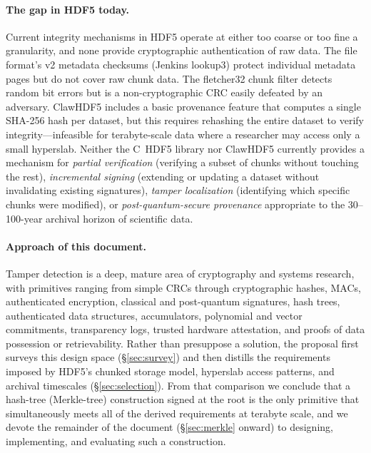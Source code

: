 \documentclass[11pt]{article}
\begin{document}
\paragraph{The gap in HDF5 today.}
Current integrity mechanisms in HDF5 operate at either too coarse or too fine
a granularity, and none provide cryptographic authentication of raw data. The
file format's v2 metadata checksums (Jenkins lookup3) protect individual
metadata pages but do not cover raw chunk data. The fletcher32 chunk filter
detects random bit errors but is a non-cryptographic CRC easily defeated by
an adversary. ClawHDF5 includes a basic provenance feature that computes a
single SHA-256 hash per dataset, but this requires rehashing the entire
dataset to verify integrity---infeasible for terabyte-scale data where a
researcher may access only a small hyperslab. Neither the C~HDF5 library nor
ClawHDF5 currently provides a mechanism for \emph{partial verification}
(verifying a subset of chunks without touching the rest), \emph{incremental
signing} (extending or updating a dataset without invalidating existing
signatures), \emph{tamper localization} (identifying which specific chunks
were modified), or \emph{post-quantum-secure provenance} appropriate to the
30--100-year archival horizon of scientific data.

\paragraph{Approach of this document.}

Tamper detection is a deep, mature area of cryptography and systems research,
with primitives ranging from simple CRCs through cryptographic hashes, MACs,
authenticated encryption, classical and post-quantum signatures, hash trees,
authenticated data structures, accumulators, polynomial and vector
commitments, transparency logs, trusted hardware attestation, and proofs of
data possession or retrievability. Rather than presuppose a solution, the
proposal first surveys this design space (\S\ref{sec:survey}) and then
distills the requirements imposed by HDF5's chunked storage model, hyperslab
access patterns, and archival timescales (\S\ref{sec:selection}). From that
comparison we conclude that a hash-tree (Merkle-tree) construction signed at
the root is the only primitive that simultaneously meets all of the derived
requirements at terabyte scale, and we devote the remainder of the document
(\S\ref{sec:merkle} onward) to designing, implementing, and evaluating such
a construction.
\end{document}
